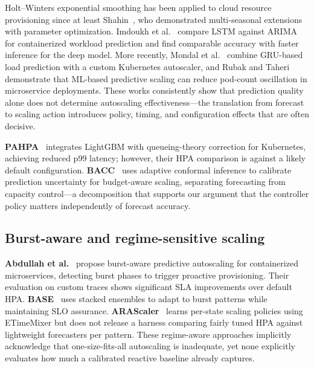 \documentclass[journal]{IEEEtran}
\begin{document}
Holt--Winters exponential smoothing has been applied to cloud resource provisioning since at least Shahin~\cite{shahin2016}, who demonstrated multi-seasonal extensions with parameter optimization. Imdoukh et al.~\cite{imdoukh2020} compare LSTM against ARIMA for containerized workload prediction and find comparable accuracy with faster inference for the deep model. More recently, Mondal et al.~\cite{mondal2023} combine GRU-based load prediction with a custom Kubernetes autoscaler, and Rubak and Taheri~\cite{rubak2023} demonstrate that ML-based predictive scaling can reduce pod-count oscillation in microservice deployments. These works consistently show that prediction quality alone does not determine autoscaling effectiveness---the translation from forecast to scaling action introduces policy, timing, and configuration effects that are often decisive.

\textbf{PAHPA}~\cite{pahpa2026} integrates LightGBM with queueing-theory correction for Kubernetes, achieving reduced p99 latency; however, their HPA comparison is against a likely default configuration. \textbf{BACC}~\cite{bacc2026} uses adaptive conformal inference to calibrate prediction uncertainty for budget-aware scaling, separating forecasting from capacity control---a decomposition that supports our argument that the controller policy matters independently of forecast accuracy.

\subsection{Burst-aware and regime-sensitive scaling}
\textbf{Abdullah et al.}~\cite{abdullah2022} propose burst-aware predictive autoscaling for containerized microservices, detecting burst phases to trigger proactive provisioning. Their evaluation on custom traces shows significant SLA improvements over default HPA. \textbf{BASE}~\cite{base2026} uses stacked ensembles to adapt to burst patterns while maintaining SLO assurance. \textbf{ARAScaler}~\cite{arascaler2025} learns per-state scaling policies using ETimeMixer but does not release a harness comparing fairly tuned HPA against lightweight forecasters per pattern. These regime-aware approaches implicitly acknowledge that one-size-fits-all autoscaling is inadequate, yet none explicitly evaluates how much a calibrated reactive baseline already captures.
\end{document}
